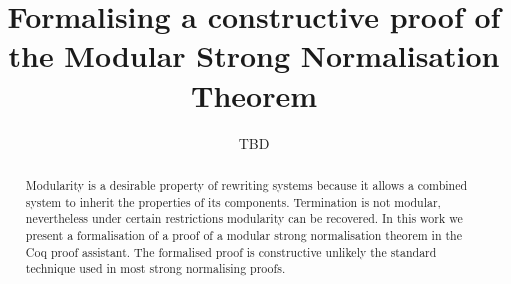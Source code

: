 \documentclass[a4paper]{llncs}
\title{Formalising a constructive proof of the Modular Strong Normalisation Theorem}
\author{TBD}
\begin{document}
\maketitle

\begin{abstract}
  Modularity is a desirable property of rewriting systems because it allows a combined system to inherit the properties of its components. Termination is not modular, nevertheless under certain restrictions modularity can be recovered. In this work we present a formalisation of a proof of a modular strong normalisation theorem in the Coq proof assistant. The formalised proof is constructive unlikely the standard technique used in most strong normalising proofs.
\end{abstract}

\thispagestyle{empty}
\mbox{}\vfill




%
%


\printbibliography
\end{document}
